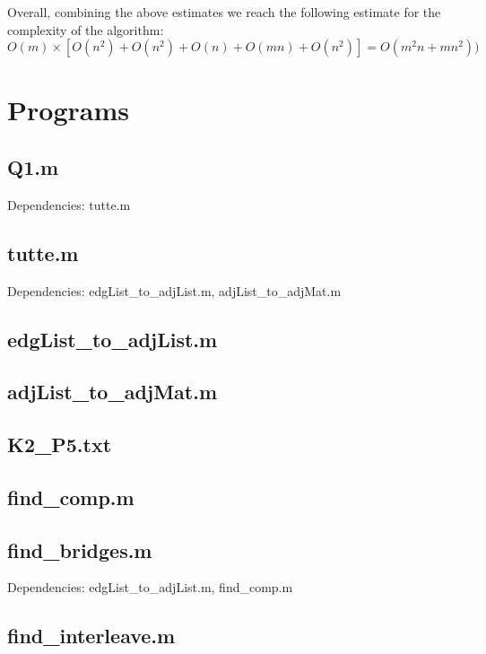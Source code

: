 \documentclass[a4paper]{article}
\begin{document}
Overall, combining the above estimates we reach the following estimate for the complexity of the algorithm:
\[ O(m) \times [O(n^2) + O(n^2) + O(n) + O(mn) + O(n^2)] = O(m^2n+mn^2)) \]


\pagebreak
\section*{Programs}

\subsection*{Q1.m}\label{PQ1}
Dependencies: tutte.m


\subsection*{tutte.m}\label{Ptutte}
Dependencies: edgList\_to\_adjList.m, adjList\_to\_adjMat.m


\subsection*{edgList\_to\_adjList.m}\label{PedgList_to_adjList}


\subsection*{adjList\_to\_adjMat.m}\label{PadjList_to_adjMat}


\subsection*{K2\_P5.txt}\label{K2_P5}


\subsection*{find\_comp.m}\label{Pfind_comp}


\subsection*{find\_bridges.m}\label{Pfind_bridges}
Dependencies: edgList\_to\_adjList.m, find\_comp.m


\newpage
\subsection*{find\_interleave.m}\label{Pfind_interleave}

\end{document}
